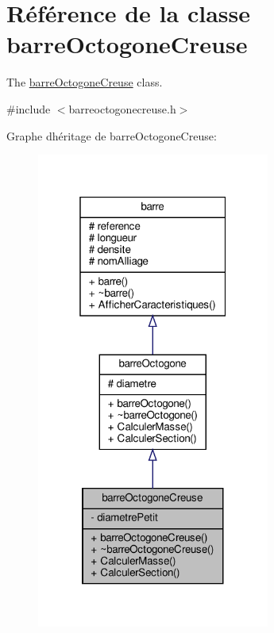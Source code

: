 \hypertarget{classbarre_octogone_creuse}{}\section{Référence de la classe barre\+Octogone\+Creuse}
\label{classbarre_octogone_creuse}


The \hyperlink{classbarre_octogone_creuse}{barre\+Octogone\+Creuse} class.  




{\ttfamily \#include $<$barreoctogonecreuse.\+h$>$}



Graphe d\textquotesingle{}héritage de barre\+Octogone\+Creuse\+:
\nopagebreak
\begin{figure}[H]
\begin{center}
\leavevmode
\includegraphics[width=217pt]{classbarre_octogone_creuse__inherit__graph}
\end{center}
\end{figure}


